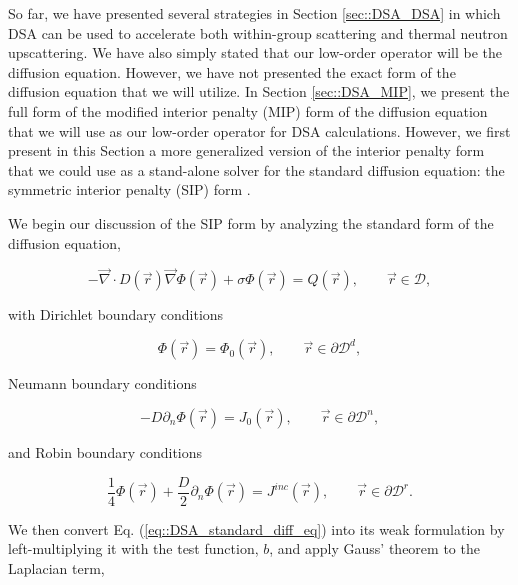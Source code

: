 So far, we have presented several strategies in Section \ref{sec::DSA_DSA} in which DSA can be used to accelerate both within-group scattering and thermal neutron upscattering. We have also simply stated that our low-order operator will be the diffusion equation. However, we have not presented the exact form of the diffusion equation that we will utilize. In Section \ref{sec::DSA_MIP}, we present the full form of the modified interior penalty (MIP) form of the diffusion equation that we will use as our low-order operator for DSA calculations. However, we first present in this Section a more generalized version of the interior penalty form that we could use as a stand-alone solver for the standard diffusion equation: the symmetric interior penalty (SIP) form \cite{arnold2002unified,ragusa2015discontinuous,ref::SIP_3D}.

We begin our discussion of the SIP form by analyzing the standard form of the diffusion equation,

\begin{equation}
\label{eq::DSA_standard_diff_eq}
- \vec{\nabla}  \cdot D (\vec{r})  \vec{\nabla} \Phi (\vec{r}) + \sigma \Phi (\vec{r}) = Q (\vec{r}) , \qquad \vec{r} \in \mathcal{D} ,
\end{equation}

\noindent with Dirichlet boundary conditions

\begin{equation}
\label{eq::DSA_standard_diff_eq_dirichlet_bound}
\Phi (\vec{r}) = \Phi_0 (\vec{r}), \qquad \vec{r} \in \partial \mathcal{D}^d ,
\end{equation}

\noindent Neumann boundary conditions

\begin{equation}
\label{eq::DSA_standard_diff_eq_neumann_bound}
- D \partial_n \Phi (\vec{r}) = J_0 (\vec{r}), \qquad \vec{r} \in \partial \mathcal{D}^n ,
\end{equation}

\noindent and Robin boundary conditions

\begin{equation}
\label{eq::DSA_standard_diff_eq_robin_bound}
\frac{1}{4}\Phi (\vec{r}) + \frac{D}{2} \partial_n \Phi (\vec{r}) = J^{inc} (\vec{r}), \qquad \vec{r} \in \partial \mathcal{D}^r .
\end{equation}

\noindent We then convert Eq. (\ref{eq::DSA_standard_diff_eq}) into its weak formulation by left-multiplying it with the test function, $b$, and apply Gauss' theorem to the Laplacian term,

